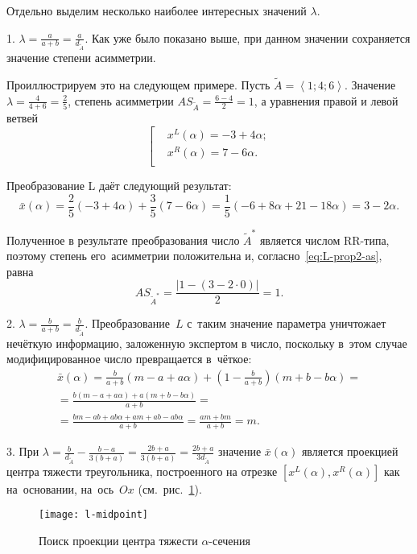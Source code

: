 Отдельно выделим несколько наиболее интересных значений $\lambda$.

1. $\displaystyle \lambda =\frac{a}{a+b}=\frac{a}{d_{\tilde A}}$. Как уже было показано выше, при данном значении сохраняется значение степени асимметрии.

Проиллюстрируем это на следующем примере. Пусть $\tilde{A}=\left\langle 1;4;6 \right\rangle $. Значение $\displaystyle \lambda =\frac{4}{4+6}=\frac{2}{5}$, степень асимметрии $\displaystyle AS_{\tilde A}=\frac{6-4}{2}=1$, а уравнения правой и левой ветвей
\begin{equation*}
  \left[ \begin{aligned}
    & {{x}^{L}}\left( \alpha  \right)=-3+4\alpha; \\ 
    & {{x}^{R}}\left( \alpha  \right)=7-6\alpha. \\ 
  \end{aligned} \right.
\end{equation*}

Преобразование L даёт следующий результат:
\begin{equation*}
  \bar{x}\left( \alpha  \right)=\frac{2}{5}\left( -3+4\alpha  \right)+\frac{3}{5}\left( 7-6\alpha  \right)=\frac{1}{5}\left( -6+8\alpha +21-18\alpha  \right)=3-2\alpha.
\end{equation*}

Полученное в результате преобразования число $\tilde A^{*}$ является числом RR-типа, поэтому степень его~асимметрии положительна и, согласно~\eqref{eq:L-prop2-as}, равна
\begin{equation*}
  AS_{\tilde A^{*}}=\frac{\left| 1-\left( 3-2\cdot 0 \right) \right|}{2}=1.
\end{equation*}

2. $\displaystyle \lambda =\frac{b}{a+b}=\frac{b}{d_{\tilde A}}$. Преобразование~$L$ с~таким значение параметра уничтожает нечёткую информацию, заложенную экспертом в число, поскольку в~этом случае модифицированное число превращается в~чёткое:
\begin{gather*}
  \bar{x}\left( \alpha  \right)=\frac{b}{a+b}\left( m-a+a\alpha \right)+\left( 1-\frac{b}{a+b} \right)\left( m+b-b\alpha \right)={}\\
  {}=\frac{b\left( m-a+a\alpha  \right)+a\left( m+b-b\alpha \right)}{a+b}={} \\ 
  {}=\frac{bm-ab+ab\alpha +am+ab-ab\alpha }{a+b}=\frac{am+bm}{a+b}=m. 
\end{gather*}

3. При $\displaystyle \lambda =\frac{b}{d_{\tilde A}}-\frac{b-a}{3\left( b+a \right)}=\frac{2b+a}{3\left( b+a \right)}=\frac{2b+a}{3d_{\tilde A}}$ значение $\bar{x}(\alpha )$ является проекцией центра тяжести треугольника, построенного на отрезке $\left[ {{x}^{L}}(\alpha ), x^R\left(\alpha \right) \right]$ как на~основании, на~ось~$Ox$ (см.~рис.~\ref{fig:l-midpoint}).
\begin{figure}[h!]
  \centering
  {
    \texttt{[image: l-midpoint]}
    \caption{Поиск проекции центра тяжести $\alpha$-сечения}
    \label{fig:l-midpoint}
  }
\end{figure}


